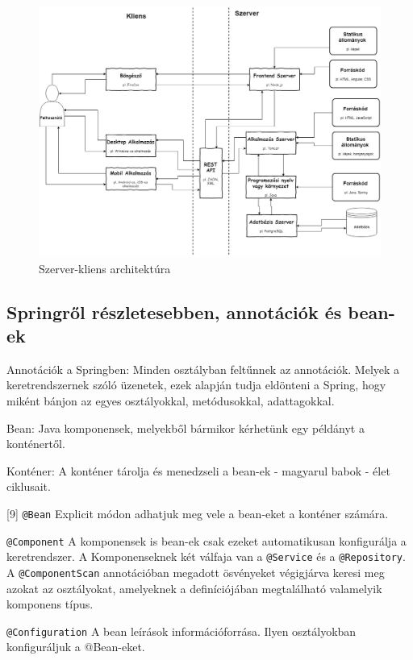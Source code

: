 \begin{figure}
\centering
\includegraphics[scale=0.365]{kepek/architecture.jpg}
\caption{Szerver-kliens architektúra}
\label{fig:architecture}
\end{figure}

\subsection{Springről részletesebben, annotációk és bean-ek}	%

Annotációk a Springben: Minden osztályban feltűnnek az annotációk. Melyek a keretrendszernek szóló üzenetek, ezek alapján tudja eldönteni a Spring, hogy miként bánjon az egyes osztályokkal, metódusokkal, adattagokkal.

Bean: Java komponensek, melyekből bármikor kérhetünk egy példányt a konténertől.

Konténer: A konténer tárolja és menedzseli a bean-ek - magyarul babok - élet ciklusait.

[9] \texttt{@Bean} Explicit módon adhatjuk meg vele a bean-eket a konténer számára.

\texttt{@Component} A komponensek is bean-ek csak ezeket automatikusan konfigurálja a keretrendszer. A Komponenseknek két válfaja van a \texttt{@Service} és a \texttt{@Repository}. A \texttt{@ComponentScan} annotációban megadott ösvényeket végigjárva keresi meg azokat az osztályokat, amelyeknek a definíciójában megtalálható valamelyik komponens típus.

\texttt{@Configuration} A bean leírások információforrása. Ilyen osztályokban konfiguráljuk a @Bean-eket.

